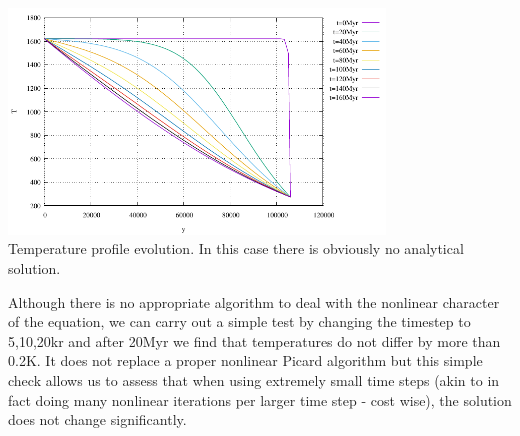 \begin{center}
\includegraphics[width=10cm]{python_codes/fieldstone_83/results_model2/Tprofiles}\\
{\captionfont Temperature profile evolution. In this case there is obviously no analytical solution.}
\end{center}

Although there is no appropriate algorithm to deal with the nonlinear character of the 
equation, we can carry out a simple test by changing the timestep to 5,10,20kr
and after 20Myr we find that temperatures do not differ by more than 0.2K. 
It does not replace a proper nonlinear Picard algorithm but this simple check 
allows us to assess that when using extremely small time steps (akin to in fact doing many
nonlinear iterations per larger time step - cost wise), the solution does not change 
significantly.




